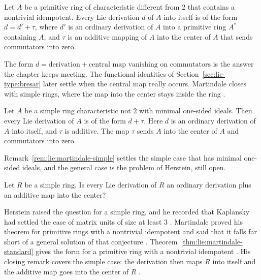 \begin{theorem}\label{thm:lie:martindale-standard}
Let $A$ be a primitive ring of characteristic different from $2$ that contains a
nontrivial idempotent. Every Lie derivation $d$ of $A$ into itself is of the form
$d=d'+\tau$, where $d'$ is an ordinary derivation of $A$ into a primitive ring
$A^{\ast}$ containing $A$, and $\tau$ is an additive mapping of $A$ into the
center of $A$ that sends commutators into zero.
\end{theorem}

The form $d=\text{derivation}+\text{central map vanishing on commutators}$ is
the answer the chapter keeps meeting.
The functional identities of
Section~\ref{sec:lie-type:bresar} later settle when the central map really
occurs. Martindale closes with simple rings, where the map into the center
stays inside the ring \cite[p.~187]{Martindale1964}.

\begin{remark}\label{rem:lie:martindale-simple}
Let $A$ be a simple ring characteristic not $2$ with minimal one-sided ideals. Then
every Lie derivation of $A$ is of the form $d+\tau$. Here $d$ is an ordinary
derivation of $A$ into itself, and $\tau$ is additive. The map $\tau$ sends $A$
into the center of $A$ and commutators into zero.
\end{remark}

Remark~\ref{rem:lie:martindale-simple} settles the simple case that has
minimal one-sided ideals, and the general case is the problem of Herstein,
still open.

\begin{problem}\label{prob:open:herstein}
Let $R$ be a simple ring.
Is every Lie derivation of $R$ an ordinary derivation plus an additive map
into the center?
\end{problem}

Herstein raised the question for a simple ring, and he recorded that Kaplansky
had settled the case of matrix units of size at least $3$
\cite[Problem~3, p.~529]{Herstein1961Lie}. Martindale proved his theorem for
primitive rings with a nontrivial idempotent and said that it falls far short
of a general solution of that conjecture \cite[p.~183]{Martindale1964}.
Theorem~\ref{thm:lie:martindale-standard} gives the form for a primitive ring
with a nontrivial idempotent \cite[Theorem~2, p.~187]{Martindale1964}. His
closing remark covers the simple case: the derivation then maps $R$ into
itself and the additive map goes into the center of $R$
\cite[p.~187]{Martindale1964}.

